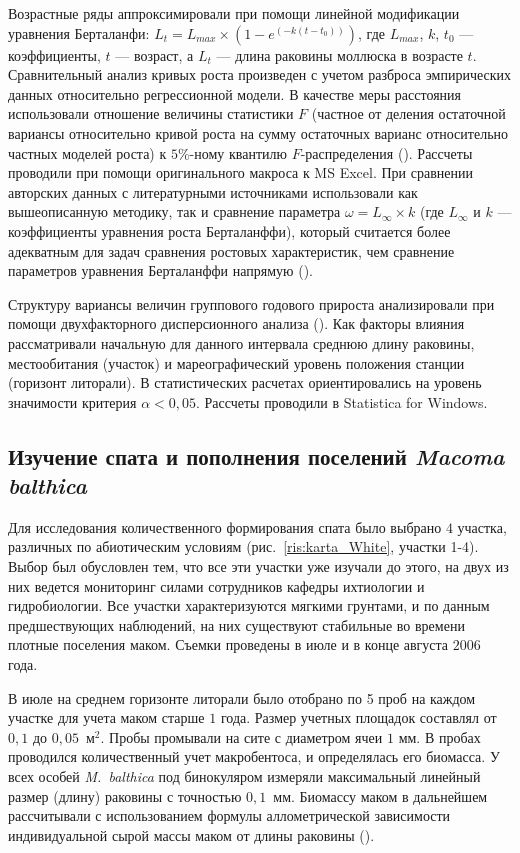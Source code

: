 Возрастные ряды аппроксимировали при помощи линейной модификации уравнения Берталанфи: $L_{t} = L_{max} \times (1 - e^{(-k(t - t_{0}))})$, где $L_{max}$, $k$, $t_{0}$ --- коэффициенты, $t$ --- возраст, а $L_{t}$ --- длина раковины моллюска в возрасте $t$.
Сравнительный анализ кривых роста произведен с учетом разброса эмпирических данных относительно регрессионной модели. 
В качестве меры расстояния использовали отношение величины статистики $F$ (частное от деления остаточной вариансы относительно кривой роста на сумму остаточных варианс относительно частных моделей роста) к $5$\%-ному квантилю $F$-распределения (\cite{Maximovich_1989}). 
Рассчеты проводили при помощи оригинального макроса к MS Excel.
При сравнении авторских данных с литературными источниками использовали как вышеописанную методику, так и сравнение параметра $\omega = L_{\infty} \times k$ (где $L_{\infty}$ и $k$ --- коэффициенты уравнения роста Берталанффи), который считается более адекватным для задач сравнения ростовых характеристик, чем сравнение параметров уравнения Берталанффи напрямую (\cite{Appeldoorn_1983, Beukema_Meehan_1985}). 

Структуру вариансы величин группового годового прироста анализировали при помощи двухфакторного дисперсионного анализа (\cite{Chambers_Hastie_1991}). 
Как факторы влияния рассматривали начальную для данного интервала среднюю длину раковины, местообитания (участок) и мареографический уровень положения станции (горизонт литорали).
В статистических расчетах ориентировались на уровень значимости критерия $\alpha < 0,05$.
Рассчеты проводили в Statistica for Windows.

\afterpage{\clearpage}

	\subsection{Изучение спата и пополнения поселений {\it Macoma balthica}}
Для исследования количественного формирования спата было выбрано $4$ участка, различных по абиотическим условиям (рис.~\ref{ris:karta_White}, участки 1-4). 
Выбор был обусловлен тем, что все эти участки уже изучали до этого, на двух из них ведется мониторинг силами сотрудников кафедры ихтиологии и гидробиологии. 
Все участки характеризуются мягкими грунтами, и по данным предшествующих наблюдений, на них существуют стабильные во времени плотные поселения маком.
Съемки проведены в июле и в конце августа $2006$ года.

В июле на среднем горизонте литорали было отобрано по 5 проб на каждом участке для учета маком старше $1$ года. 
Размер учетных площадок составлял от $0,1$ до $0,05$~м$^2$. 
Пробы промывали на сите с диаметром ячеи $1$ мм. 
В пробах проводился количественный учет макробентоса, и определялась его биомасса.
У всех особей \textit{M.~balthica} под бинокуляром измеряли максимальный линейный размер (длину) раковины с точностью $0,1$~мм. 
Биомассу маком в дальнейшем рассчитывали с использованием формулы аллометрической зависимости индивидуальной сырой массы маком от длины раковины (\cite{Maximovich_et_al_1993}).

